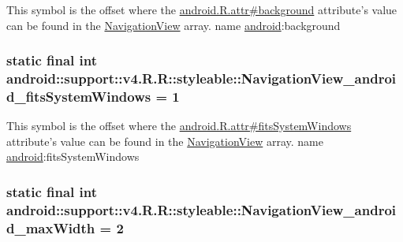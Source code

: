 This symbol is the offset where the \hyperlink{}{android.R.attr\#background} attribute's value can be found in the \hyperlink{classandroid_1_1support_1_1v4_1_1_r_1_1styleable_5278cd545a73a5a4af313995900ae2d8}{NavigationView} array.  name \hyperlink{namespaceandroid}{android}:background \hypertarget{classandroid_1_1support_1_1v4_1_1_r_1_1styleable_8fef1cdf6a087e5067022f2a52afaf85}{
\subsubsection[{NavigationView\_\-android\_\-fitsSystemWindows}]{\setlength{\rightskip}{0pt plus 5cm}static final int android::support::v4.R.R::styleable::NavigationView\_\-android\_\-fitsSystemWindows = 1}}
\label{classandroid_1_1support_1_1v4_1_1_r_1_1styleable_8fef1cdf6a087e5067022f2a52afaf85}


This symbol is the offset where the \hyperlink{}{android.R.attr\#fitsSystemWindows} attribute's value can be found in the \hyperlink{classandroid_1_1support_1_1v4_1_1_r_1_1styleable_5278cd545a73a5a4af313995900ae2d8}{NavigationView} array.  name \hyperlink{namespaceandroid}{android}:fitsSystemWindows \hypertarget{classandroid_1_1support_1_1v4_1_1_r_1_1styleable_10571fdca8781dd2769893b7a2204a50}{
\subsubsection[{NavigationView\_\-android\_\-maxWidth}]{\setlength{\rightskip}{0pt plus 5cm}static final int android::support::v4.R.R::styleable::NavigationView\_\-android\_\-maxWidth = 2}}
\label{classandroid_1_1support_1_1v4_1_1_r_1_1styleable_10571fdca8781dd2769893b7a2204a50}


